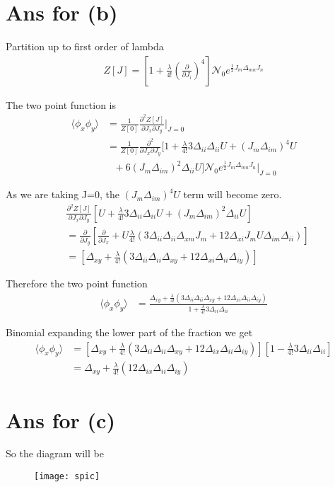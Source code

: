 \documentclass[12pt, letterpaper]{article}
\newcommand*{\1}{\hspace{1pt}}
\begin{document}
    \section*{Ans for (b)}

    Partition up to first order of lambda 
    \begin{align}
        Z[J] = [1 + \frac{\lambda}{4!}(\frac{\partial}{\partial J_{i}})^{4}]\mathcal{N}_{0} e^{\frac{1}{2} J_{m} \Delta _{mn} J_{n}}
    \end{align}


    The two point function is
    \begin{align*}
        \langle \phi_{x}\phi_{y} \rangle & = \frac{1}{Z[0]}\frac{\partial ^2 Z[J]}{\partial J_{x} \partial J_{y}}\Biggr|_{J=0} \\
        & =  \frac{1}{Z[0]}\frac{\partial ^2 }{\partial J_{x} \partial J_{y}}  [1+\frac{\lambda}{4!}3\Delta_{ii}\Delta_{ii}U + (J_{m}\Delta_{im})^{4} U \\
        & \ \ \  + 6(J_{m}\Delta_{im})^{2}\Delta_{ii} U]\mathcal{N}_{0} e^{\frac{1}{2} J_{m} \Delta _{mn} J_{n}}\Biggr|_{J=0}
    \end{align*}

    As we are taking J=0, the  $(J_{m}\Delta_{im})^{4} U$ term will become zero.
    \begin{align*}
         &\frac{\partial ^2 Z[J]}{\partial J_{x} \partial J_{y}}  [U+\frac{\lambda}{4!}3\Delta_{ii}\Delta_{ii}U + (J_{m}\Delta_{im})^{2}\Delta_{ii} U] \\
         & = \frac{\partial }{\partial J_{y}}[\frac{\partial}{\partial J_{x}} + U \frac{\lambda}{4!}(3\Delta_{ii}\Delta_{ii}\Delta_{xm}J_{m} + 12\Delta_{xi}J_{m}U\Delta_{im}\Delta_{ii})] \\ 
         & = [\Delta_{xy} + \frac{\lambda}{4!}(3\Delta_{ii}\Delta_{ii}\Delta_{xy} + 12\Delta_{xi}\Delta_{ii}\Delta_{iy})]
    \end{align*}

    Therefore the two point function
    \begin{align}
        \langle \phi_{x}\phi_{y} \rangle & = \frac{\Delta_{xy} + \frac{\lambda}{4!}(3\Delta_{ii}\Delta_{ii}\Delta_{xy} + 12\Delta_{xi}\Delta_{ii}\Delta_{iy})}{1+\frac{\lambda}{4!} 3\Delta_{ii}\Delta_{ii}}
    \end{align}

    Binomial expanding the lower part of the fraction we get
     \begin{align}
        \langle \phi_{x}\phi_{y} \rangle & = [\Delta_{xy} + \frac{\lambda}{4!}( 3\Delta_{ii}\Delta_{ii}\Delta_{xy} + 12\Delta_{ix}\Delta_{ii}\Delta_{iy})][1-\frac{\lambda}{4!} 3\Delta_{ii}\Delta_{ii}] \\
        & = \Delta_{xy} + \frac{\lambda}{4!}(12\Delta_{ix}\Delta_{ii}\Delta_{iy})
    \end{align}

    \section*{Ans for (c)}

    So the diagram will be 
    \begin{figure}[h]
    \centering
    \texttt{[image: spic]}
    \end{figure}
\end{document}
